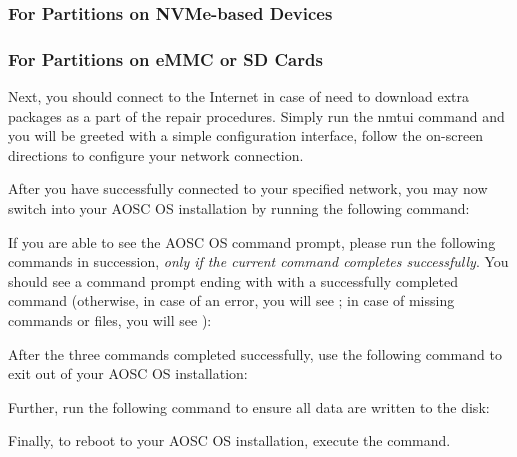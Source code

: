 \documentclass[a5paper,twosided,11pt]{book}
\begin{document}
    \subsubsection*{For Partitions on NVMe-based Devices}


    \subsubsection*{For Partitions on eMMC or SD Cards}



    Next, you should connect to the Internet in case of need to download extra packages as a part of the repair procedures. Simply run the nmtui command and you will be greeted with a simple configuration interface, follow the on-screen directions to configure your network connection.

    After you have successfully connected to your specified network, you may now switch into your AOSC OS installation by running the following command:



    If you are able to see the AOSC OS command prompt,
    please run the following commands in succession,
    \textit{only if the current command completes successfully}.
    You should see a command prompt ending with \icode{\#} with a successfully completed command (otherwise,
    in case of an error, you will see \icode{!}; in case of missing commands or files, you will see ):


    After the three commands completed successfully, use the following command to exit out of your AOSC OS installation:


    Further, run the following command to ensure all data are written to the disk:


    Finally, to reboot to your AOSC OS installation, execute the  command.
\end{document}
